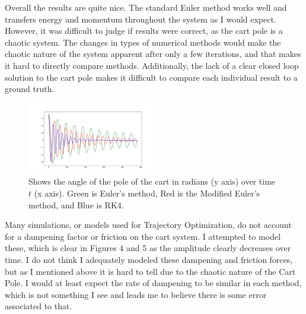 \documentclass[12pt]{article}
\begin{document}
Overall the results are quite nice. The standard Euler method works well and transfers
energy and momentum throughout the system as I would expect. However, it was difficult to
judge if results were correct, as the cart pole is a chaotic system. The changes in types
of numerical methods would make the chaotic nature of the system apparent after only a
few iterations, and that makes it hard to directly compare methods. Additionally,
the lack of a clear closed loop solution to the cart pole makes it difficult to compare
each individual result to a ground truth.

\begin{figure}[!ht]
 \centering
 \includegraphics[width=0.5\textwidth]{../data/Figure_2}
 \caption{Shows the angle of the pole of the cart in radians (y axis) over
 time $t$ (x axis). Green is Euler's method, Red is the Modified Euler's method, and Blue is RK4.}
 \label{fig:yub}
\end{figure}

Many simulations, or models used for Trajectory Optimization, do not account for a dampening
factor or friction on the cart system. I attempted to model these, which is clear in Figures
4 and 5 as the amplitude clearly decreases over time. I do not think I adequately modeled
these dampening and friction forces, but as I mentioned above it is hard to tell due to the
chaotic nature of the Cart Pole. I would at least expect the rate of dampening to be similar
in each method, which is not something I see and leads me to believe there is some error associated
to that.
\end{document}
